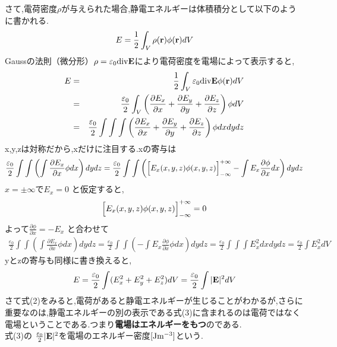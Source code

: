 \documentclass{jsarticle}
\begin{document}
さて,電荷密度$\rho$が与えられた場合,静電エネルギーは体積積分として以下のように書かれる.
\begin{eqnarray*}
E = \frac{1}{2} \int_{V}^{} \rho({\bf r}) \phi({\bf r}) dV
\end{eqnarray*}
Gaussの法則（微分形）$\rho = \varepsilon_0 {\rm div}{\bf E}$により電荷密度を電場によって表示すると,
\begin{eqnarray*}
E &=& \frac{1}{2} \int_{V}^{} \varepsilon_0 {\rm div}{\bf E} \phi({\bf r}) dV \\
&=& \frac{\varepsilon_0}{2} \int_{V}^{} \left( \frac{\partial E_x}{\partial x} + \frac{\partial E_y}{\partial y} + \frac{\partial E_z}{\partial z} \right)\phi dV \\
&=& \frac{\varepsilon_0}{2} \int \int \int \left( \frac{\partial E_x}{\partial x} + \frac{\partial E_y}{\partial y} + \frac{\partial E_z}{\partial z} \right)\phi  dx dy dz
\end{eqnarray*}
x,y,zは対称だから,xだけに注目する.xの寄与は
\begin{equation*}
\frac{\varepsilon_0}{2} \int \int \left( \int \frac{\partial E_x}{\partial x}\phi dx \right) dy dz 
= \frac{\varepsilon_0}{2} \int \int \left( \Bigl[ E_x(x,y,z) \phi(x,y,z) \Bigr]_{-\infty}^{+\infty} - \int E_x \frac{\partial \phi}{\partial x} dx \right) dy dz
\end{equation*}
$x=\pm \infty$で$E_x=0$ と仮定すると,
\begin{eqnarray*}
\Bigl[ E_x(x,y,z) \phi(x,y,z) \Bigr]_{-\infty}^{+\infty} = 0
\end{eqnarray*}
よって$\frac{\partial \phi}{\partial x}=-E_x$ と合わせて
\begin{eqnarray*}
\frac{\varepsilon_0}{2} \int \int \left( \int \frac{\partial E_x}{\partial x}\phi dx \right) dy dz = \frac{\varepsilon_0}{2} \int \int \left( - \int E_x \frac{\partial \phi}{\partial x}\phi dx \right) dy dz = \frac{\varepsilon_0}{2} \int \int \int E_x^2 dx dy dz = \frac{\varepsilon_0}{2} \int E_x^2 dV
\end{eqnarray*}
yとzの寄与も同様に書き換えると,
\begin{eqnarray}
E = \frac{\varepsilon_0}{2} \int (E_x^2 + E_y^2 + E_z^2) dV = \frac{\varepsilon_0}{2} \int |{\bf E}|^2 dV
\end{eqnarray}
さて式(2)をみると,電荷があると静電エネルギーが生じることがわかるが,さらに重要なのは,静電エネルギーの別の表示である式(3)に含まれるのは電荷ではなく電場ということである.つまり{\bf 電場はエネルギーをもつ}のである. \\
式(3)の $\frac{\varepsilon_0}{2}|{\bf E}|^2$を電場のエネルギー密度$[{\rm Jm^{-3}}]$という. \\
\end{document}
